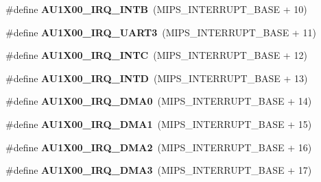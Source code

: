 \begin{DoxyCompactItemize}
\mbox{\label{group__bsp__interrupt_ga9b846711e167c3911933fc9730a2512b}} 
\#define {\bfseries A\+U1\+X00\+\_\+\+I\+R\+Q\+\_\+\+I\+N\+TB}~(M\+I\+P\+S\+\_\+\+I\+N\+T\+E\+R\+R\+U\+P\+T\+\_\+\+B\+A\+SE + 10)
\item 
\mbox{\label{group__bsp__interrupt_ga6de297921c07161e4521718a036a1387}} 
\#define {\bfseries A\+U1\+X00\+\_\+\+I\+R\+Q\+\_\+\+U\+A\+R\+T3}~(M\+I\+P\+S\+\_\+\+I\+N\+T\+E\+R\+R\+U\+P\+T\+\_\+\+B\+A\+SE + 11)
\item 
\mbox{\label{group__bsp__interrupt_ga8b8a77ce570d568bc0ddf5d2ce99026e}} 
\#define {\bfseries A\+U1\+X00\+\_\+\+I\+R\+Q\+\_\+\+I\+N\+TC}~(M\+I\+P\+S\+\_\+\+I\+N\+T\+E\+R\+R\+U\+P\+T\+\_\+\+B\+A\+SE + 12)
\item 
\mbox{\label{group__bsp__interrupt_ga8b13707217fd1067777ff7dc084e5fdd}} 
\#define {\bfseries A\+U1\+X00\+\_\+\+I\+R\+Q\+\_\+\+I\+N\+TD}~(M\+I\+P\+S\+\_\+\+I\+N\+T\+E\+R\+R\+U\+P\+T\+\_\+\+B\+A\+SE + 13)
\item 
\mbox{\label{group__bsp__interrupt_ga3be4de1fb65181ea76ffa738716d791f}} 
\#define {\bfseries A\+U1\+X00\+\_\+\+I\+R\+Q\+\_\+\+D\+M\+A0}~(M\+I\+P\+S\+\_\+\+I\+N\+T\+E\+R\+R\+U\+P\+T\+\_\+\+B\+A\+SE + 14)
\item 
\mbox{\label{group__bsp__interrupt_gafd6c102e59c09299da44b15c8f1ff436}} 
\#define {\bfseries A\+U1\+X00\+\_\+\+I\+R\+Q\+\_\+\+D\+M\+A1}~(M\+I\+P\+S\+\_\+\+I\+N\+T\+E\+R\+R\+U\+P\+T\+\_\+\+B\+A\+SE + 15)
\item 
\mbox{\label{group__bsp__interrupt_ga7bc8d9ecb3a7d9e378f3d2b3f2cbac30}} 
\#define {\bfseries A\+U1\+X00\+\_\+\+I\+R\+Q\+\_\+\+D\+M\+A2}~(M\+I\+P\+S\+\_\+\+I\+N\+T\+E\+R\+R\+U\+P\+T\+\_\+\+B\+A\+SE + 16)
\item 
\mbox{\label{group__bsp__interrupt_ga36f4d53ae7c6381414f936a7bf25a2df}} 
\#define {\bfseries A\+U1\+X00\+\_\+\+I\+R\+Q\+\_\+\+D\+M\+A3}~(M\+I\+P\+S\+\_\+\+I\+N\+T\+E\+R\+R\+U\+P\+T\+\_\+\+B\+A\+SE + 17)
\item 
\mbox{\label{group__bsp__interrupt_ga7fb18f4a368b6259a46eb49038cb95a4}} 

\end{DoxyCompactItemize}

